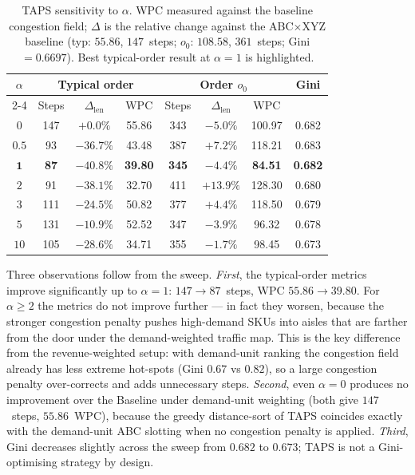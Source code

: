 \documentclass[12pt,a4paper]{article}
\begin{document}
\begin{table}[H]
\centering
\caption{TAPS sensitivity to $\alpha$. WPC measured against the baseline
  congestion field; $\Delta$ is the relative change against the
  ABC$\times$XYZ baseline (typ: $55.86$, $147$~steps; $o_0$: $108.58$, $361$~steps;
  Gini $= 0.6697$). Best typical-order result at $\alpha = 1$ is highlighted.}
\label{tab:taps_alpha}
\renewcommand{\arraystretch}{1.20}
\begin{tabular}{cccccccc}
\hline
\multirow{2}{*}{$\alpha$} & \multicolumn{3}{c}{Typical order} & \multicolumn{3}{c}{Order $o_0$} & \multirow{2}{*}{Gini} \\
\cline{2-4}\cline{5-7}
 & Steps & $\Delta_\mathrm{len}$ & WPC & Steps & $\Delta_\mathrm{len}$ & WPC & \\
\hline
$0$    & 147 & $+0.0\%$ & 55.86 & 343 & $-5.0\%$  & 100.97 & 0.682 \\
$0.5$  &  93 & $-36.7\%$ & 43.48 & 387 & $+7.2\%$  & 118.21 & 0.683 \\
$\mathbf{1}$ & \textbf{87} & $\mathbf{-40.8\%}$ & \textbf{39.80} & \textbf{345} & $\mathbf{-4.4\%}$ & \textbf{84.51} & \textbf{0.682} \\
$2$    &  91 & $-38.1\%$ & 32.70 & 411 & $+13.9\%$ & 128.30 & 0.680 \\
$3$    & 111 & $-24.5\%$ & 50.82 & 377 & $+4.4\%$  & 118.50 & 0.679 \\
$5$    & 131 & $-10.9\%$ & 52.52 & 347 & $-3.9\%$  &  96.32 & 0.678 \\
$10$   & 105 & $-28.6\%$ & 34.71 & 355 & $-1.7\%$  &  98.45 & 0.673 \\
\hline
\end{tabular}
\end{table}

Three observations follow from the sweep.
\emph{First}, the typical-order metrics improve significantly up to $\alpha = 1$:
$147 \to 87$~steps, WPC $55.86 \to 39.80$.
For $\alpha \ge 2$ the metrics do not improve further --- in fact they worsen,
because the stronger congestion penalty pushes high-demand SKUs into aisles
that are farther from the door under the demand-weighted traffic map.
This is the key difference from the revenue-weighted setup: with demand-unit
ranking the congestion field already has less extreme hot-spots (Gini $0.67$
vs $0.82$), so a large congestion penalty over-corrects and adds unnecessary
steps.
\emph{Second}, even $\alpha = 0$ produces no improvement over the Baseline
under demand-unit weighting (both give $147$~steps, $55.86$~WPC), because the
greedy distance-sort of TAPS coincides exactly with the demand-unit ABC slotting
when no congestion penalty is applied.
\emph{Third}, Gini decreases slightly across the sweep from $0.682$ to $0.673$;
TAPS is not a Gini-optimising strategy by design.
\end{document}

